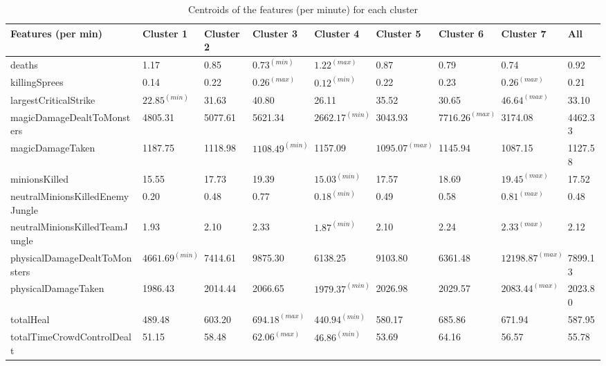 \begin{table}
  \tiny
  \caption{Centroids of the features (per minute) for each cluster}
  \label{tab:centers}
  \begin{tabular}{lp{}p{}p{}p{}p{}p{}p{}p{}}
  \toprule
Features (per min)&                   Cluster 1&      Cluster 2&      Cluster 3&      Cluster 4&      Cluster 5&      Cluster 6&        Cluster 7&     All\\
  \midrule
deaths&                             1.17&    0.85&    $0.73^{(min)}$&    $1.22^{(max)}$&    0.87&    0.79&     0.74&    0.92\\ \hline
killingSprees&                      0.14&    0.22&    $0.26^{(max)}$&    $0.12^{(min)}$&    0.22&    0.23&     $0.26^{(max)}$&    0.21\\ \hline
largestCriticalStrike&             $22.85^{(min)}$&   31.63&   40.80&   26.11&   35.52&   30.65&    $46.64^{(max)}$&   33.10\\ \hline
magicDamageDealtToMonsters&      4805.31& 5077.61& 5621.34& $2662.17^{(min)}$& 3043.93& $7716.26^{(max)}$&  3174.08& 4462.33\\ \hline
magicDamageTaken&                1187.75& 1118.98& $1108.49^{(min)}$& 1157.09& $1095.07^{(max)}$& 1145.94&  1087.15& 1127.58\\ \hline
minionsKilled&                     15.55&   17.73&   19.39&   $15.03^{(min)}$&   17.57&   18.69&    $19.45^{(max)}$&   17.52\\ \hline
neutralMinionsKilledEnemyJungle&    0.20&    0.48&    0.77&    $0.18^{(min)}$&    0.49&    0.58&     $0.81^{(max)}$&    0.48\\ \hline
neutralMinionsKilledTeamJungle&     1.93&    2.10&    2.33&    $1.87^{(min)}$&    2.10&    2.24&     $2.33^{(max)}$&    2.12\\ \hline
physicalDamageDealtToMonsters&   $4661.69^{(min)}$& 7414.61& 9875.30& 6138.25& 9103.80& 6361.48& $12198.87^{(max)}$& 7899.13\\ \hline
physicalDamageTaken&             1986.43& 2014.44& 2066.65& $1979.37^{(min)}$& 2026.98& 2029.57&  $2083.44^{(max)}$& 2023.80\\ \hline
totalHeal&                        489.48&  603.20&  $694.18^{(max)}$&  $440.94^{(min)}$&  580.17&  685.86&   671.94&  587.95\\ \hline
totalTimeCrowdControlDealt&        51.15&   58.48&   $62.06^{(max)}$&   $46.86^{(min)}$&   53.69&   64.16&    56.57&   55.78\\ \hline

\end{tabular}
\end{table}
